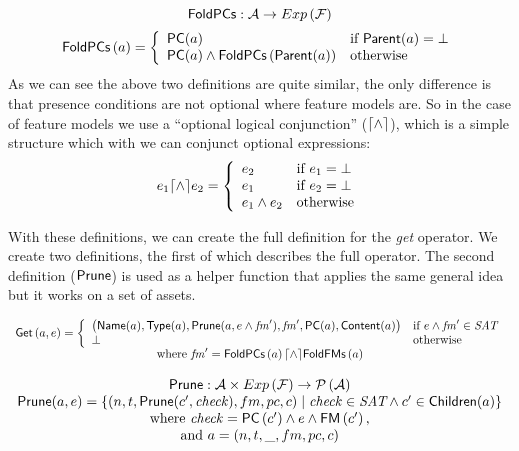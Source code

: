 \[
  {\sf FoldPCs} : \mathcal{A} \rightarrow Exp \left( \mathcal{F} \right)
\]
\[
  {\sf FoldPCs}\left(a\right) =
  \left\{
    \begin{array}{ll}
      {\sf PC}(a) & \text{if } {\sf Parent}(a) = \bot \\
      {\sf PC}(a) \land {\sf FoldPCs}\left( {\sf Parent}(a) \right) & \text{otherwise}
    \end{array}
  \right.
\]
As we can see the above two definitions are quite similar, the only difference
is that presence conditions are not optional where feature models are. So in
the case of feature models we use a ``optional logical conjunction'' 
(\(\lceil \land \rceil\)), which is a simple structure which with we can conjunct
optional expressions:
\[
  e_1 \lceil \land \rceil e_2 =
  \left\{
    \begin{array}{ll}
      e_2 & \text{if } e_1 = \bot \\
      e_1 & \text{if } e_2 = \bot \\
      e_1 \land e_2 & \text{otherwise}
    \end{array}
  \right.
\]

With these definitions, we can create the full definition for the \emph{get}
operator. We create two definitions, the first of which describes the full
operator. The second definition (\({\sf Prune}\)) is used as a helper
function that applies the same general idea but it works on a set of assets.

\[
  \begin{array}{c}
    {\sf Get}\left( a, e \right) = 
      \left\{
        \begin{array}{ll}
          \left( {\sf Name}(a), {\sf Type}(a), {\sf Prune}(a, e \land \mathit{fm}'), \mathit{fm}', {\sf PC}(a), {\sf Content}(a) \right) & \text{if } e \land \mathit{fm}' \in \textit{SAT} \\
          \bot & \text{otherwise}
        \end{array}
      \right. \\
      \text{where }\mathit{fm}' = {\sf FoldPCs}\left(a\right) \lceil \land \rceil {\sf FoldFMs}\left(a\right)
  \end{array}
\]

\[
  \begin{array}{c}\def\arraystretch{1.4}
    \filterchildrenfunc : \binaryFunc{\allassets}{\expressions{\features}}{\powerset{\allassets}} \\
    \def\arraystretch{1}
    \filterchildrenfunc(a, e) = 
      \left\{
        (
          n,
          t,
          \filterchildrenfunc(c', \mathit{check}),
          fm,
          pc,
          c
        ) 
        \hspace*{1mm} \middle| \hspace*{1mm}
        \mathit{check} \in \sat 
        \land c' \in \childrenfunc(a) 
      \right\} \\
    \text{where }\mathit{check} = \presenceconditionfunc\left( c' \right) \land e \land \featuremodelfunc\left(c'\right)\text{,} \\
    \text{and }a = \left( n, t, \_, fm, pc, c \right)
  \end{array}
\]

